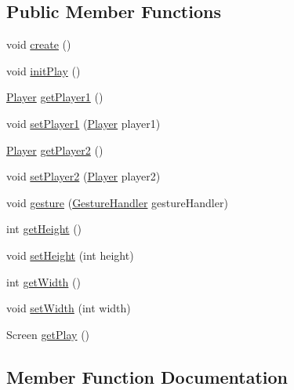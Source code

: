 \subsection*{Public Member Functions}
\begin{DoxyCompactItemize}
\item 
void \hyperlink{classbattle_1_1logic_1_1_my_game_aaa17aa71b0b74a26b068bff909c64b46}{create} ()
\item 
void \hyperlink{classbattle_1_1logic_1_1_my_game_a3210d841f9a7007420332f2936e53bb2}{init\+Play} ()
\item 
\hyperlink{classbattle_1_1logic_1_1_player}{Player} \hyperlink{classbattle_1_1logic_1_1_my_game_a726ff655252e52e5dda1e29b57e3b40d}{get\+Player1} ()
\item 
void \hyperlink{classbattle_1_1logic_1_1_my_game_a87de308252f1501a8d38c38de2b20eea}{set\+Player1} (\hyperlink{classbattle_1_1logic_1_1_player}{Player} player1)
\item 
\hyperlink{classbattle_1_1logic_1_1_player}{Player} \hyperlink{classbattle_1_1logic_1_1_my_game_a121ac8300c5b8898d2cd260a57d72b14}{get\+Player2} ()
\item 
void \hyperlink{classbattle_1_1logic_1_1_my_game_ac0bb5b45e1a742456e08868c22cc14d6}{set\+Player2} (\hyperlink{classbattle_1_1logic_1_1_player}{Player} player2)
\item 
void \hyperlink{classbattle_1_1logic_1_1_my_game_a8e481ce6a6eabc6a124ea2dd64f7fe35}{gesture} (\hyperlink{classbattle_1_1logic_1_1_gesture_handler}{Gesture\+Handler} gesture\+Handler)
\item 
int \hyperlink{classbattle_1_1logic_1_1_my_game_af754b59ba9d849fb2ecd930e0b695e81}{get\+Height} ()
\item 
void \hyperlink{classbattle_1_1logic_1_1_my_game_aea510afed0178d9c1336b626c5ef901d}{set\+Height} (int height)
\item 
int \hyperlink{classbattle_1_1logic_1_1_my_game_a8842e4b9021ec721492baf54d73a4089}{get\+Width} ()
\item 
void \hyperlink{classbattle_1_1logic_1_1_my_game_aaaeaabf6bbe2ada5219e56d299a6ab85}{set\+Width} (int width)
\item 
Screen \hyperlink{classbattle_1_1logic_1_1_my_game_a85d0616eefdf5416f6d6cdbbd33ecd40}{get\+Play} ()
\end{DoxyCompactItemize}


\subsection{Member Function Documentation}
\hypertarget{classbattle_1_1logic_1_1_my_game_aaa17aa71b0b74a26b068bff909c64b46}{}
